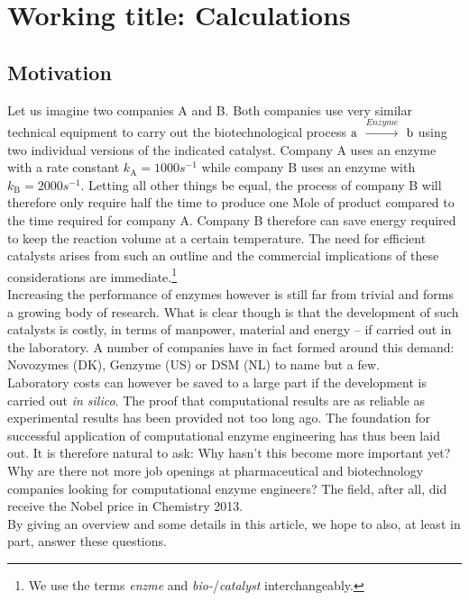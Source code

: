 \chapter[Working title: Calculations]
{Working title: Calculations\label{ch1}}


\section{Motivation}\label{sec:mot}
Let us imagine two companies A and B.
Both companies use very similar technical equipment to carry out the biotechnological process $\ce{a}$ $\xrightarrow{Enzyme}$ $\ce{b}$ using two individual versions of the indicated catalyst.
Company A uses an enzyme with a rate constant $k_\text{A} = 1000s^{-1}$ while company B uses an enzyme with $k_\text{B} = 2000s^{-1}$.
Letting all other things be equal, the process of company B will therefore only require half the time to produce one Mole of product compared to the time required for company A.
Company B therefore can save energy required to keep the reaction volume at a certain temperature.
The need for efficient catalysts arises from such an outline and the commercial implications of these considerations are immediate.\footnote{We use the terms \textit{enzme} and \textit{bio-}/\textit{catalyst} interchangeably.}\\
Increasing the performance of enzymes however is still far from trivial and forms a growing body of research.
What is clear though is that the development of such catalysts is costly, in terms of manpower, material and energy -- if carried out in the laboratory.
A number of companies have in fact formed around this demand: Novozymes (DK), Genzyme (US) or DSM (NL) to name but a few\cite{meyer2013use, kirk2002industrial, beilen2002enzyme, schmid2002use}.\\
Laboratory costs can however be saved to a large part if the development is carried out \textit{in silico}.
The proof that computational results are as reliable as experimental results has been provided not too long ago\cite{claeyssens2006high}.
The foundation for successful application of computational enzyme engineering has thus been laid out.
It is therefore natural to ask: Why hasn't this become more important yet?
Why are there not more job openings at pharmaceutical and biotechnology companies looking for computational enzyme engineers?
The field, after all, did receive the Nobel price in Chemistry 2013.\\
By giving an overview and some details in this article, we hope to also, at least in part, answer these questions.


